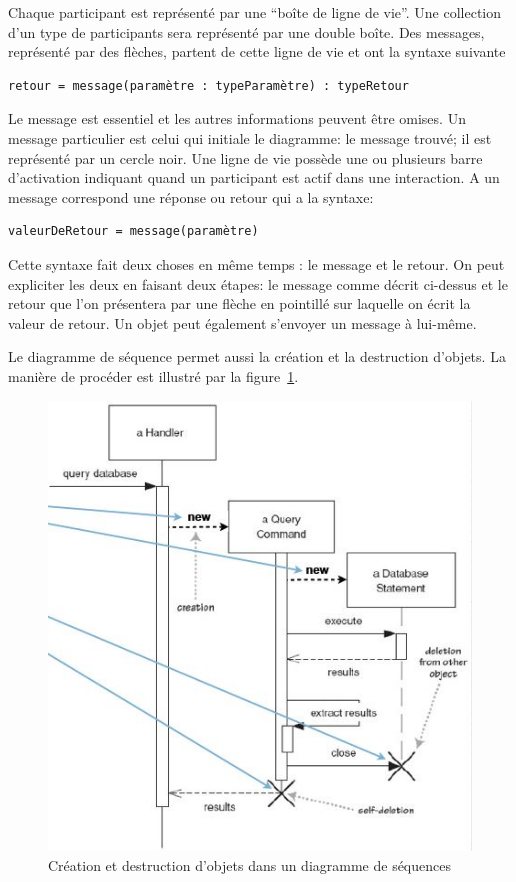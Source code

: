 Chaque participant est représenté par une ``boîte de ligne de vie''.
Une collection d'un type de participants sera représenté par une double boîte.
Des messages, représenté par des flèches,
partent de cette ligne de vie et ont la syntaxe suivante
\begin{verbatim}
retour = message(paramètre : typeParamètre) : typeRetour
\end{verbatim}
Le message est essentiel et les autres informations peuvent être omises.
Un message particulier est celui qui initiale le diagramme:
le message trouvé; il est représenté par un cercle noir.
Une ligne de vie possède une ou plusieurs barre d'activation
indiquant quand un participant est actif dans une interaction.
A un message correspond une réponse ou retour qui a la syntaxe:
\begin{verbatim}
valeurDeRetour = message(paramètre)
\end{verbatim}
Cette syntaxe fait deux choses en même temps : le message et le retour.
On peut expliciter les deux en faisant deux étapes:
le message comme décrit ci-dessus et le retour que l'on présentera
par une flèche en pointillé sur laquelle on écrit la valeur de retour.
Un objet peut également s'envoyer un message à lui-même.

Le diagramme de séquence permet aussi la création et la destruction d'objets.
La manière de procéder est illustré
par la figure~\ref{diagramme_sequences_objet}.
\begin{figure}[h]
  \centering
  \includegraphics[scale=0.75]{diagramme_sequences_objet.jpg}
  \caption{Création et destruction d'objets dans un diagramme de séquences}
  \label{diagramme_sequences_objet}
\end{figure}


